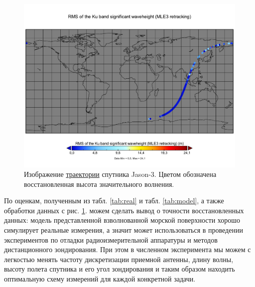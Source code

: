 \begin{figure}[H]
    \centering
    \includegraphics[width=\linewidth]{img/swh_rms_ku_mle3}
    \caption{Изображение \href{}{траектории} спутника Jason-3. Цветом
    обозначена восстановленная высота значительного волнения.}
    \label{fig:mle3}
\end{figure}


По оценкам, полученным из табл. \ref{tab:real} и табл. \ref{tab:model}, а также
обработки данных с рис. \ref{fig:mle3}.
можем сделать вывод о точности восстановленных данных: модель представленной
взволнованной морской поверхности хорошо симулирует реальные измерения, а
значит может использоваться в проведении экспериментов по отладки
радиоизмерительной аппаратуры и методов дистанционного зондирования. 
При этом в численном эксперимента мы можем с легкостью менять частоту
дискретизации приемной антенны, длину волны, высоту полета спутника и его угол
зондирования и таким образом находить оптимальную схему измерений для каждой
конкретной задачи.
